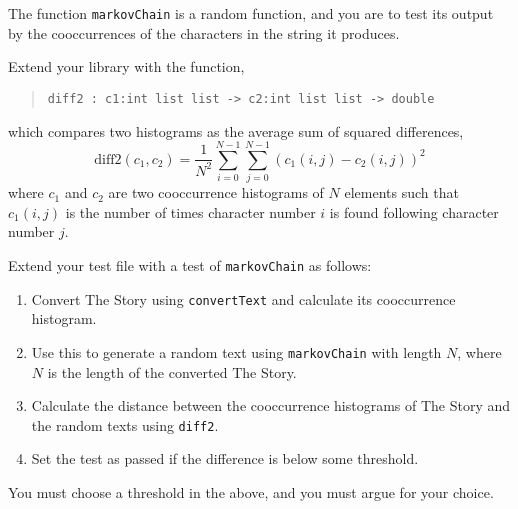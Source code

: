 \label{diff}
The function \lstinline{markovChain} is a random function, and
you are to test its output by the cooccurrences of the characters in
the string it produces.

Extend your library with the function,
\begin{quote}
  \mbox{\lstinline!diff2 : c1:int list list -> c2:int list list -> double!}
\end{quote}
which compares two histograms as the average sum of squared differences,
\begin{equation}
  \text{diff2}(c_1, c_2) = \frac{1}{N^2}\sum_{i=0}^{N-1}\sum_{j=0}^{N-1}\left(c_1(i,j) - c_2(i,j)\right)^2
\end{equation}
where $c_1$ and $c_2$ are two cooccurrence histograms of $N$ elements
such that $c_1(i,j)$ is the number of times character number $i$ is
found following character number $j$.

Extend your test file with a test of \lstinline{markovChain}
as follows:
\begin{enumerate}
\item Convert The Story using \lstinline{convertText} and calculate
  its cooccurrence histogram.
\item Use this to generate a random text using \lstinline{markovChain}
  with length $N$, where $N$ is the length of the converted The Story.
\item Calculate the distance between the cooccurrence histograms of
  The Story and the random texts using \lstinline{diff2}.
\item Set the test as passed if the difference is below some threshold.
\end{enumerate}
You must choose a threshold in the above, and you must argue for your choice.
